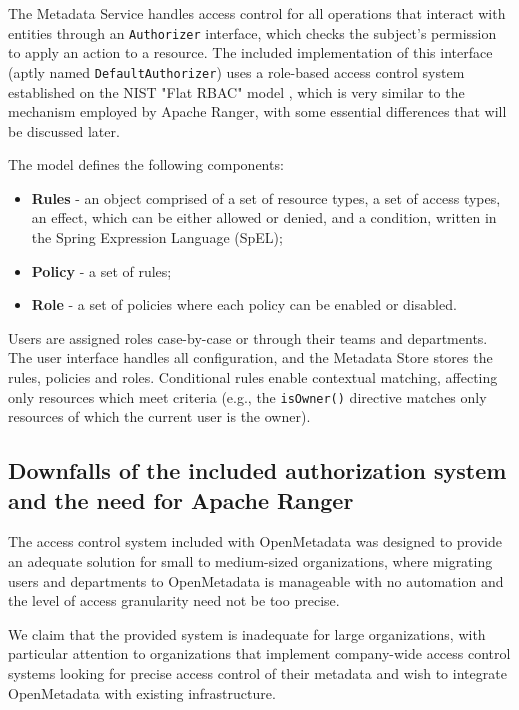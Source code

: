 The Metadata Service handles access control for all operations that interact with entities through an \texttt{Authorizer} interface, which checks the subject's permission to apply an action to a resource. The included implementation of this interface (aptly named \texttt{DefaultAuthorizer}) uses a role-based access control system established on the NIST "Flat RBAC" model \cite{nistRBAC2000Sandhu, buildingAccessControlForOpenMetadata2022Mathew}, which is very similar to the mechanism employed by Apache Ranger, with some essential differences that will be discussed later. 

The model defines the following components:

\begin{itemize}
    \item \textbf{Rules} - an object comprised of a set of resource types, a set of access types, an effect, which can be either allowed or denied, and a condition, written in the Spring Expression Language (SpEL);
    \item \textbf{Policy} - a set of rules;
    \item \textbf{Role} - a set of policies where each policy can be enabled or disabled.
\end{itemize}

Users are assigned roles case-by-case or through their teams and departments. The user interface handles all configuration, and the Metadata Store stores the rules, policies and roles. Conditional rules enable contextual matching, affecting only resources which meet criteria (e.g., the \texttt{isOwner()} directive matches only resources of which the current user is the owner). 

\subsection{Downfalls of the included authorization system and the need for Apache Ranger}

The access control system included with OpenMetadata was designed to provide an adequate solution for small to medium-sized organizations, where migrating users and departments to OpenMetadata is manageable with no automation and the level of access granularity need not be too precise.

We claim that the provided system is inadequate for large organizations, with particular attention to organizations that implement company-wide access control systems looking for precise access control of their metadata and wish to integrate OpenMetadata with existing infrastructure.

